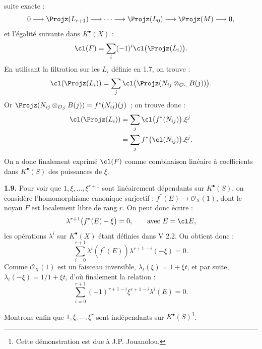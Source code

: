 suite exacte :
\[
  0\longrightarrow \Projz(L_{r+1})\longrightarrow\cdots\longrightarrow
  \Projz(L_0)\longrightarrow\Projz(M)\longrightarrow 0,
\]
et l'égalité suivante dans \(K^{\bullet}(X)\) :
\[
  \cl(F)=\sum_i(-1)^i\cl\bigl(\Projz(L_i)\bigr).
\]
En utilisant la filtration sur les \(L_i\) définie en 1.7, on trouve :
\[
  \cl(\Projz(L_i))=\sum_j \cl\bigl(\Projz(N_{ij}\otimes_{\mathcal O_S}B(j))\bigr).
\]
Or \(\Projz(N_{ij}\otimes_{\mathcal O_S}B(j))=f^*(N_{ij})(j)\)~; on trouve donc :
\[
\begin{aligned}
  \cl(\Projz(L_i))
  &=\sum_j \cl\bigl(f^*(N_{ij})\bigr).\xi^j \\
  &=\sum_j f^*\bigl(\cl(N_{ij})\bigr).\xi^j.
\end{aligned}
\]
On a donc finalement exprimé \(\cl(F)\) comme combinaison linéaire à coefficients dans \(K^{\bullet}(S)\) des puissances de \(\xi\).

\textbf{1.9.} Pour voir que \(1,\xi,\ldots,\xi^{r+1}\) sont linéairement dépendants sur \(K^{\bullet}(S)\), on considère l'homomorphisme canonique surjectif : \(f^*(E)\to\mathcal O_X(1)\), dont le noyau \(F\) est localement libre de rang \(r\). On peut donc écrire :
\[
  \lambda^{r+1}\bigl(f^*(E)-\xi\bigr)=0,
  \qquad \text{avec } E=\cl E,
\]
les opérations \(\lambda^i\) sur \(K^{\bullet}(X)\) étant définies dans V 2.2. On obtient donc :
\[
  \sum_{i=0}^{r+1}\lambda^i(f^*(E))\lambda^{r+1-i}(-\xi)=0.
\]
Comme \(\mathcal O_X(1)\) est un faisceau inversible, \(\lambda_t(\xi)=1+\xi t\), et par suite, \(\lambda_t(-\xi)=1/1+\xi t\), d'où finalement la relation :
\begin{equation}\tag{1.9.1}
  \sum_{i=0}^{r+1}(-1)^{r+1-i}\xi^{r+1-i}\lambda^i(E)=0.
\end{equation}

Montrons enfin que \(1,\xi,\ldots,\xi^r\) sont indépendants sur \(K^{\bullet}(S)\)\footnote{Cette démonstration est due à J.P. Jouanolou.}.


